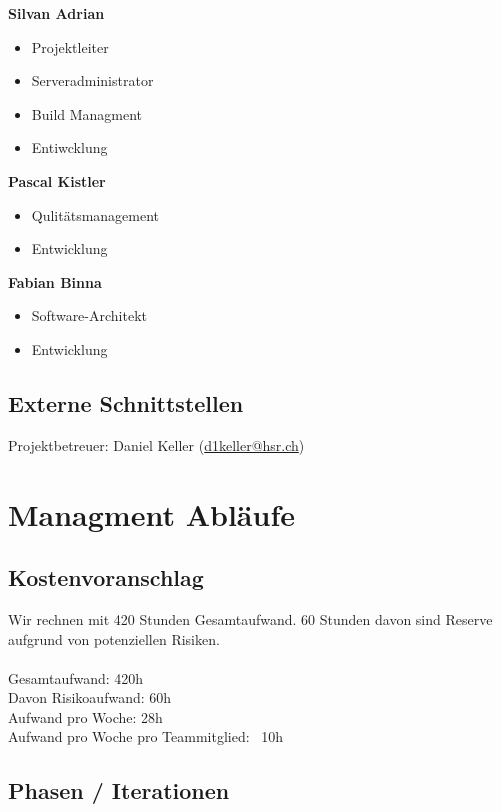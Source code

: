 \documentclass[11pt]{scrartcl}
\begin{document}
\textbf{Silvan Adrian}
\begin{itemize}
    \item Projektleiter
    \item Serveradministrator
    \item Build Managment
    \item Entiwcklung
\end{itemize}

\textbf{Pascal Kistler}
\begin{itemize}
    \item Qulitätsmanagement
    \item Entwicklung
\end{itemize}
\textbf{Fabian Binna}
\begin{itemize}
    \item Software-Architekt
    \item Entwicklung
\end{itemize}

\subsection{Externe Schnittstellen}
\label{sec:Externe Schnittstellen}
Projektbetreuer: Daniel Keller (\href{mailto:d1keller@hsr.ch}{d1keller@hsr.ch})

\section{Managment Abläufe}
\label{sec:Managment Abläufe}
\subsection{Kostenvoranschlag}
\label{sec:Kostenvoranschlag}
Wir rechnen mit 420 Stunden Gesamtaufwand. 60 Stunden davon sind Reserve aufgrund von potenziellen Risiken.\\
\\
Gesamtaufwand: 420h \\
Davon Risikoaufwand: 60h \\
Aufwand pro Woche: 28h \\
Aufwand pro Woche pro Teammitglied: ~10h \\

\subsection{Phasen / Iterationen}
\label{sec:Phasen / Iterationen}
\end{document}
